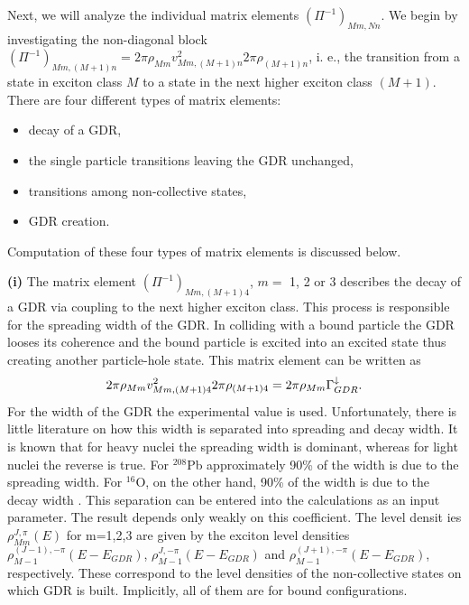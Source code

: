 Next, we will analyze the individual matrix elements $(\Pi^{-1})_{Mm,Nn}$.
We begin by investigating the non-diagonal block $(\Pi^{-1})_{Mm,(M+1)n}=2%
\pi\rho_{Mm}v_{Mm,(M+1)n}^{2}2\pi\rho_{(M+1)n}$, i. e., the transition from
a state in exciton class $M$ to a state in the next higher exciton class $%
(M+1)$. There are four different types of matrix elements:

\begin{itemize}
\item decay of a GDR,

\item the single particle transitions leaving the GDR unchanged,

\item transitions among non-collective states,

\item GDR creation.
\end{itemize}

Computation of these four types of matrix elements is discussed below.

\smallskip \textbf{(i)} The matrix element $(\Pi^{-1})_{Mm,(M+1)4}$, $m=$ 1,
2 or 3 describes the decay of a GDR via coupling to the next higher exciton
class. This process is responsible for the spreading width of the GDR. In
colliding with a bound particle the GDR looses its coherence and the bound
particle is excited into an excited state thus creating another
particle-hole state. This matrix element can be written as
\begin{equation}
2\pi\rho_{Mm}v_{Mm,(M+1)4}^{2}2\pi\rho_{(M+1)4}=2\pi\rho_{Mm}\Gamma_{GDR}^{%
\downarrow}.
\end{equation}
For the width of the GDR the experimental value is used. Unfortunately,
there is little literature on how this width is separated into spreading and
decay width. It is known that for heavy nuclei the spreading width is
dominant, whereas for light nuclei the reverse is true. For $^{208}$Pb
approximately 90\% of the width is due to the spreading width. For $^{16}$O,
on the other hand, 90\% of the width is due to the decay width \cite{BBB83}.
This separation can be entered into the calculations as an input parameter.
The result depends only weakly on this coefficient. The level densit%
ies $\rho_{Mm}^{J,\pi}(E)$ for m=1,2,3 are given by
the exciton level densities $\rho_{M-1}^{(J-1),-\pi}(E-E_{GDR})$, $%
\rho_{M-1}^{J,-\pi}(E-E_{GDR})$ and $\rho_{M-1}^{(J+1),-\pi}(E-E_{GDR})$,
respectively. These correspond to the level densities of the non-collective
states on which GDR is built. Implicitly, all of them are for bound
configurations.

